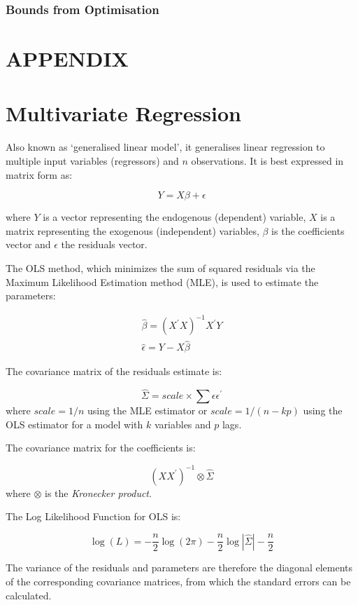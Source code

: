 \documentclass{article}
\begin{document}
    \subsubsection{Bounds from Optimisation}\label{bounds-from-optimisation}

    \section{APPENDIX}\label{appendix}

    \section{Multivariate Regression}\label{multivariate-regression}

Also known as `generalised linear model', it generalises linear
regression to multiple input variables (regressors) and \(n\)
observations. It is best expressed in matrix form as:

\[
Y = X \beta + \epsilon
\]

where \(Y\) is a vector representing the endogenous (dependent)
variable, \(X\) is a matrix representing the exogenous (independent)
variables, \(\beta\) is the coefficients vector and \(\epsilon\) the
residuals vector.

The OLS method, which minimizes the sum of squared residuals via the
Maximum Likelihood Estimation method (MLE), is used to estimate the
parameters:

\[
\begin{align}
\hat{\beta} = (X^\prime X)^{-1} X^\prime Y \\
\hat{\epsilon} = Y - X \hat{\beta}
\end{align}
\]

The covariance matrix of the residuals estimate is:

\[
\hat{\Sigma} = scale \times  \sum \epsilon \epsilon^\prime
\] where \(scale = 1/ n\) using the MLE estimator or
\(scale= 1/ (n - kp)\) using the OLS estimator for a model with \(k\)
variables and \(p\) lags.

The covariance matrix for the coefficients is:

\[
(X X^\prime)^{-1} \otimes \hat{\Sigma}
\] where \(\otimes\) is the \emph{Kronecker product}.

The Log Likelihood Function for OLS is:

\[
\log(L) = -\frac{n}{2}\log (2 \pi) -\frac{n}{2}\log | \hat{\Sigma}| - \frac{n}{2}
\]

The variance of the residuals and parameters are therefore the diagonal
elements of the corresponding covariance matrices, from which the
standard errors can be calculated.
\end{document}
